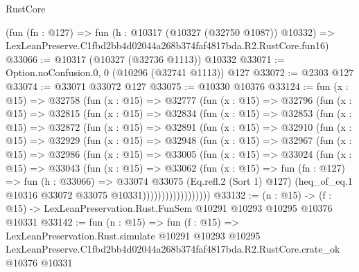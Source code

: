 \begin{lexlean}{RustCore}
\begin{coremodule}
    (fun (fn : @127) =>
    fun (h : @10317 (@10327 (@32750 @1087)) @10332) =>
    LexLeanPreserve.C1fbd2bb4d02044a268b374faf4817bda.R2.RustCore.fun16)
@33066 := @10317 (@10327 (@32736 @1113)) @10332
@33071 := Option.noConfusion.{0, 0} (@10296 (@32741 @1113)) @127
@33072 := @2303 @127
@33074 := @33071 @33072 @127
@33075 := @10330 @10376
@33124 := fun (x : @15) =>
  @32758
    (fun (x : @15) =>
    @32777
      (fun (x : @15) =>
      @32796
        (fun (x : @15) =>
        @32815
          (fun (x : @15) =>
          @32834
            (fun (x : @15) =>
            @32853
              (fun (x : @15) =>
              @32872
                (fun (x : @15) =>
                @32891
                  (fun (x : @15) =>
                  @32910
                    (fun (x : @15) =>
                    @32929
                      (fun (x : @15) =>
                      @32948
                        (fun (x : @15) =>
                        @32967
                          (fun (x : @15) =>
                          @32986
                            (fun (x : @15) =>
                            @33005
                              (fun (x : @15) =>
                              @33024
                                (fun (x : @15) =>
                                @33043
                                  (fun (x : @15) =>
                                  @33062
                                    (fun (x : @15) =>
                                    fun (fn : @127) =>
                                    fun (h : @33066) =>
                                    @33074
                                      @33075
                                      (Eq.refl.{2} (Sort 1) @127)
                                      (heq_of_eq.{1} @10316 @33072 @33075 @10331))))))))))))))))))
@33132 := (n : @15) ->
  (f : @15) -> LexLeanPreservation.Rust.FunSem @10291 @10293 @10295 @10376 @10331
@33142 := fun (n : @15) =>
  fun (f : @15) =>
  LexLeanPreservation.Rust.simulate
    @10291
    @10293
    @10295
    LexLeanPreserve.C1fbd2bb4d02044a268b374faf4817bda.R2.RustCore.crate_ok
    @10376
    @10331
\end{coremodule}
\end{lexlean}
